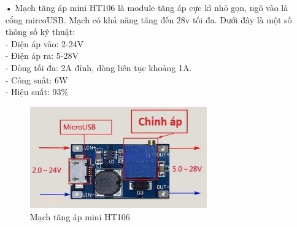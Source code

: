 \begin{itemize}
	\item[•]Mạch tăng áp mini HT106 là module tăng áp cực kì nhỏ gọn, ngõ vào là cổng mircoUSB. Mạch có khả năng tăng đến 28v tối đa. Dưới đây là một số thông số kỹ thuật:\\
	-	Điện áp vào: 2-24V\\
	-	Điện áp ra: 5-28V\\
	-	Dòng tối đa: 2A đỉnh, dòng liên tục khoảng 1A.\\
	-	Công suất: 6W\\
	-	Hiệu suất: 93\%
	\begin{figure}[H]
		\centering    
		\includegraphics[width=3in]{ht06}
		\caption[Mạch tăng áp mini HT106]{Mạch tăng áp mini HT106}
		\label{fig:ht06}
	\end{figure}
	

\end{itemize}
